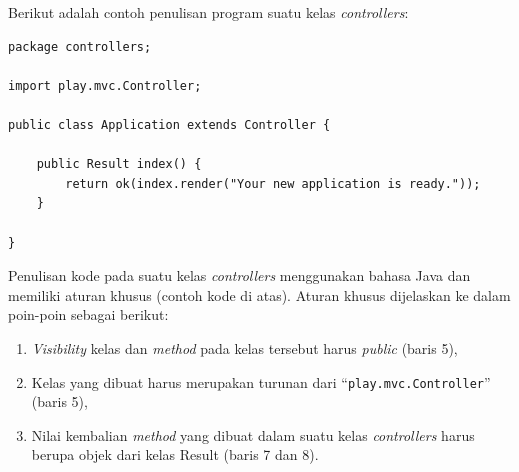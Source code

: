 Berikut adalah contoh penulisan program suatu kelas \textit{controllers}:

\begin{lstlisting}
package controllers;

import play.mvc.Controller;

public class Application extends Controller {

	public Result index() {
		return ok(index.render("Your new application is ready."));
	}

}
\end{lstlisting}

Penulisan kode pada suatu kelas \textit{controllers} menggunakan bahasa Java dan memiliki aturan khusus (contoh kode di atas). Aturan khusus dijelaskan ke dalam poin-poin sebagai berikut:
\begin{enumerate}
	\item \textit{Visibility} kelas dan \textit{method} pada kelas tersebut harus \textit{public} (baris 5),
	\item Kelas yang dibuat harus merupakan turunan dari ``\texttt{play.mvc.Controller}'' (baris 5),
	\item Nilai kembalian \textit{method} yang dibuat dalam suatu kelas \textit{controllers} harus berupa objek dari kelas Result (baris 7 dan 8).
\end{enumerate}
	
